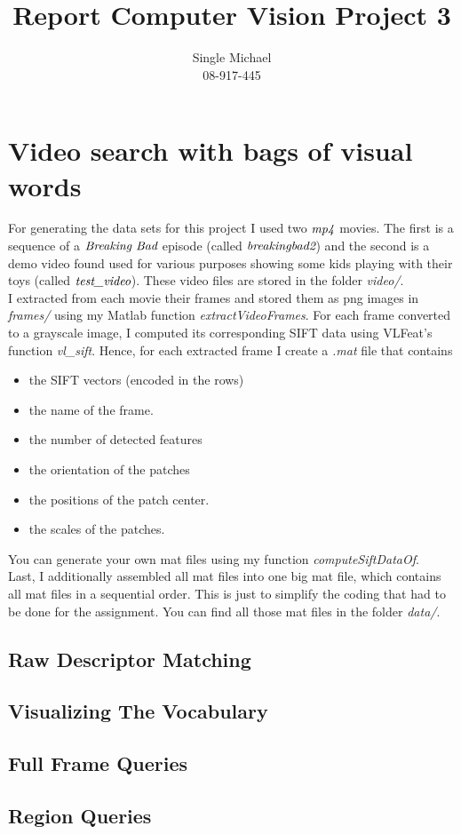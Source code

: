 \documentclass{paper}
\title{Report Computer Vision Project 3}
\author{Single Michael\\08-917-445}
\begin{document}
\maketitle


\section{Video search with bags of visual words}
For generating the data sets for this project I used two $\emph{mp4}$ movies. The first is a sequence of a $\emph{Breaking Bad}$ episode (called $\emph{breakingbad2}$) and the second is a demo video found used for various purposes showing some kids playing with their toys 
(called $\emph{test\_video}$). These video files are stored in the folder \emph{video/}. \\

I extracted from each movie their frames and stored them as png images in \emph{frames/} using my Matlab function \emph{extractVideoFrames}. For each frame converted to a grayscale image, I computed its corresponding SIFT data using VLFeat's function \emph{vl\_sift}.
Hence, for each extracted frame I create a \emph{.mat} file that contains 

\begin{itemize}
    \item the SIFT vectors (encoded in the rows)
    \item the name of the frame.
    \item the number of detected features
    \item the orientation of the patches
    \item the positions of the patch center.
    \item the scales of the patches.
\end{itemize}

You can generate your own mat files using my function \emph{computeSiftDataOf}. \\

Last, I additionally assembled all mat files into one big mat file, which contains all mat files in a sequential order. This is just to simplify the coding that had to be done for the assignment. You can find all those mat files in the folder \emph{data/}.

\subsection{Raw Descriptor Matching}
\subsection{Visualizing The Vocabulary}
\subsection{Full Frame Queries}
\subsection{Region Queries}
\end{document}
